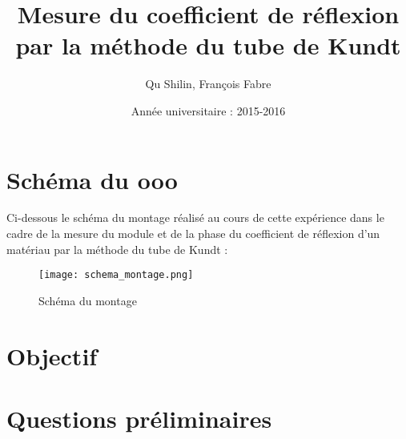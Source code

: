 \documentclass[a4paper,11pt]{article}
\title{Mesure du coefficient de réflexion par la méthode du tube de Kundt}
\author{Qu Shilin, François Fabre}
\date{Année universitaire :  2015-2016}
\begin{document}
\maketitle
\newpage

 \setcounter{page}{1}

\section{Schéma du ooo}
Ci-dessous le schéma du montage réalisé au cours de cette expérience dans le cadre de la mesure du module et de la phase du coefficient de réflexion d'un matériau par la méthode du tube de Kundt :
\begin{figure}[h]
\texttt{[image: schema\_montage.png]}
\caption{Schéma du montage}
\end{figure}

\section{Objectif}



\section{Questions préliminaires}
\end{document}
